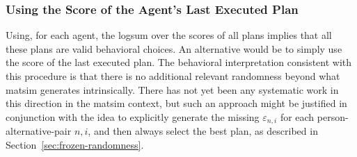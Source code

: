 %
%



\subsubsection{Using the Score of the Agent's Last Executed Plan}
\label{ch:economicEval:valuingBehavior:output2Eval:executed}
Using, for each agent, the logsum over the scores of all plans implies that all these plans are valid behavioral choices.  An alternative would be to simply use the score of the last executed plan.  The behavioral interpretation consistent with this procedure is that there is no additional relevant randomness beyond what \acrshort{matsim} generates intrinsically.  There has not yet been any systematic work in this direction in the \acrshort{matsim} context, but such an approach might be justified 
in conjunction 
with the idea to explicitly generate the missing $\varepsilon_{n,i}$ for each person-alternative-pair $n,i$, and then always select the best plan, as described in Section~\ref{sec:frozen-randomness}.



